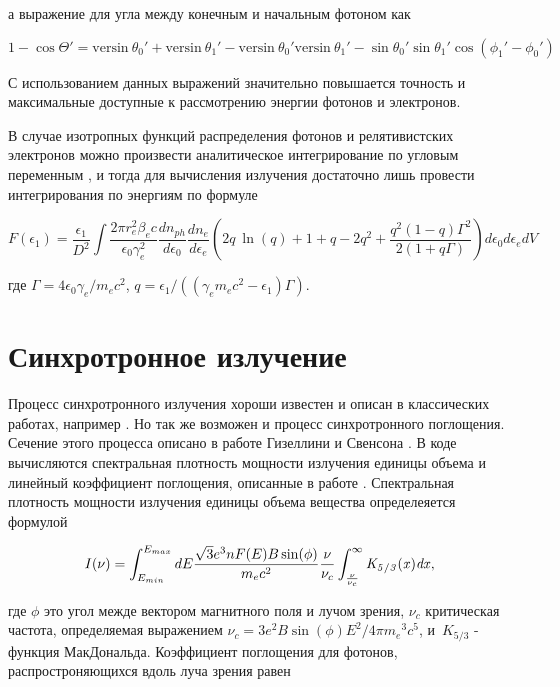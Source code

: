 а выражение для угла между конечным и начальным фотоном как

\begin{equation}
	1 - \cos \Theta' = \text{versin}~\theta_0' + \text{versin}~\theta_1' - \text{versin}~ \theta_0' \text{versin}~\theta_1' - \sin \theta_0'\sin \theta_1' \cos(\phi_1'-\phi_0')
\end{equation}

С использованием данных выражений значительно повышается точность и максимальные доступные к рассмотрению энергии фотонов и электронов.

В случае изотропных функций распределения фотонов и релятивистских электронов можно произвести аналитическое интегрирование по угловым переменным \cite{JonesCompton, BykovUvarov2000}, и тогда для вычисления излучения достаточно лишь провести интегрирования по энергиям по формуле

\begin{equation}
F(\epsilon_1)=\frac{\epsilon_1}{D^2}\int \frac{2 \pi r_e^2 \beta_e c}{\epsilon_0 \gamma_e^2} \frac{dn_{ph}}{d\epsilon_0}\frac{dn_e}{d\epsilon_e}(2 q~ \ln(q)+1+q-2q^2+\frac{q^2(1-q)\Gamma^2}{2(1+q\Gamma)})d\epsilon_0 d\epsilon_e dV
\end{equation}

где $\Gamma=4\epsilon_0\gamma_e/m_e c^2$, $q=\epsilon_1/((\gamma_e m_e c^2-\epsilon_1)\Gamma)$.

\section{Синхротронное излучение}\label{SynchrotronFormulae}
Процесс синхротронного излучения хороши известен и описан в классических работах, например \cite{Ginzburg1975}. Но так же возможен и процесс синхротронного поглощения. Сечение этого процесса описано в работе Гизеллини и Свенсона \cite{Ghisellini1991}. В коде вычисляются спектральная плотность мощности излучения единицы объема и линейный коэффициент поглощения, описанные в работе \cite{Ghisellini}. Спектральная плотность мощности излучения единицы объема вещества определеяется формулой

\begin{equation} \label{emission}
	I(\nu)=\int_{E_{min}}^{E_{max}} dE \frac {\sqrt {3}{e}^{3}n F(E) B \sin ( \phi)}{{m_e}{c}^{2}}
	\frac{\nu}{\nu_c}\int_{\frac {\nu}{\nu_c}}^{\infty }\it K_{5/3}(x)dx,
\end{equation}

где $\phi$ это угол межде вектором магнитного поля и лучом зрения, $\displaystyle\nu_{c}$ критическая частота, определяемая выражением $\displaystyle\nu_{c} = 3 e^{2} B \sin(\phi) E^{2}/4\pi {m_{e}}^{3} c^{5}$, и~$K_{5/3}$ - функция МакДональда.
Коэффициент поглощения для фотонов, распростроняющихся вдоль луча зрения равен

